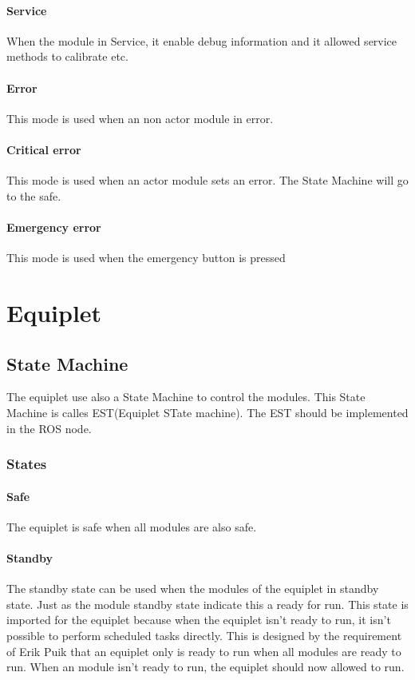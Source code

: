 \documentclass[12pt,a4paper]{report}
\begin{document}
\paragraph{Service}When the module in Service, it enable debug information and it allowed service methods to calibrate etc.
\paragraph{Error}This mode is used when an non actor module in error.
\paragraph{Critical error}This mode is used when an actor module sets an error. The State Machine will go to the safe.
\paragraph{Emergency error}This mode is used when the emergency button is pressed

\section{Equiplet}
\subsection{State Machine}
The equiplet use also a State Machine to control the modules. This State Machine is calles EST(Equiplet STate machine). The EST should be implemented in the ROS node.

\subsubsection{States}
\paragraph{Safe}The equiplet is safe when all modules are also safe.
\paragraph{Standby}The standby state can be used when the modules of the equiplet in standby state. Just as the module standby state indicate this a ready for run. This state is imported for the equiplet because when the equiplet isn’t ready to run, it isn’t possible to perform scheduled tasks directly. This is designed by the requirement of Erik Puik that an equiplet only is ready to run when all modules are ready to run. When an module isn't ready to run, the equiplet should now allowed to run.
\end{document}

